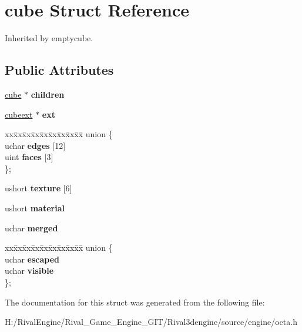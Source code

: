 \hypertarget{structcube}{}\section{cube Struct Reference}
\label{structcube}


Inherited by emptycube.

\subsection*{Public Attributes}
\begin{DoxyCompactItemize}
\item 
\mbox{\label{structcube_aafb02cf1aa0596ea8677b84654da9e79}} 
\hyperlink{structcube}{cube} $\ast$ {\bfseries children}
\item 
\mbox{\label{structcube_a6369b99225574ebfc5e4806004492f21}} 
\hyperlink{structcubeext}{cubeext} $\ast$ {\bfseries ext}
\item 
\mbox{\label{structcube_a7a1b12cae3c23f9df97683de0d1e62ea}} 
\begin{tabbing}
xx\=xx\=xx\=xx\=xx\=xx\=xx\=xx\=xx\=\kill
union \{\\
\>uchar {\bfseries edges} \mbox{[}12\mbox{]}\\
\>uint {\bfseries faces} \mbox{[}3\mbox{]}\\
\}; \\

\end{tabbing}\item 
\mbox{\label{structcube_afd1fe0c107339a3c20060cda213b8aa5}} 
ushort {\bfseries texture} \mbox{[}6\mbox{]}
\item 
\mbox{\label{structcube_adabf7826306d245930ea049e0a8bf76e}} 
ushort {\bfseries material}
\item 
\mbox{\label{structcube_a715d3e7eef34036806eaa216a36afdbe}} 
uchar {\bfseries merged}
\item 
\mbox{\label{structcube_a19df9808564c30c7529e8f9af2431320}} 
\begin{tabbing}
xx\=xx\=xx\=xx\=xx\=xx\=xx\=xx\=xx\=\kill
union \{\\
\>uchar {\bfseries escaped}\\
\>uchar {\bfseries visible}\\
\}; \\

\end{tabbing}\end{DoxyCompactItemize}


The documentation for this struct was generated from the following file\+:\begin{DoxyCompactItemize}
\item 
H\+:/\+Rival\+Engine/\+Rival\+\_\+\+Game\+\_\+\+Engine\+\_\+\+G\+I\+T/\+Rival3dengine/source/engine/octa.\+h\end{DoxyCompactItemize}
